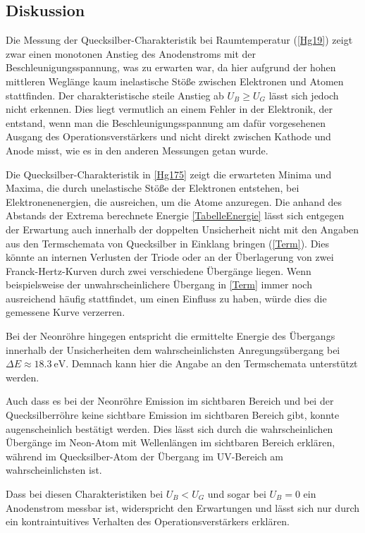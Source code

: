 \documentclass[
	a4paper,
	12pt,
	pagesize,
	ngerman
]{scrartcl}
\begin{document}
	\subsection{Diskussion}
	Die Messung der Quecksilber-Charakteristik bei Raumtemperatur (\cref{Hg19}) zeigt zwar einen monotonen Anstieg des Anodenstroms mit der Beschleunigungsspannung, was zu erwarten war, da hier aufgrund der hohen mittleren Weglänge kaum inelastische Stöße zwischen Elektronen und Atomen stattfinden. 
	Der charakteristische steile Anstieg ab $U_B \geq U_G$ lässt sich jedoch nicht erkennen.
	Dies liegt vermutlich an einem Fehler in der Elektronik, der entstand, wenn man die Beschleunigungsspannung am dafür vorgesehenen Ausgang des Operationsverstärkers und nicht direkt zwischen Kathode und Anode misst, wie es in den anderen Messungen getan wurde.
	\par
	Die Quecksilber-Charakteristik in \cref{Hg175} zeigt die erwarteten Minima und Maxima, die durch unelastische Stöße der Elektronen entstehen, bei Elektronenenergien, die ausreichen, um die Atome anzuregen.
	Die anhand des Abstands der Extrema berechnete Energie \cref{TabelleEnergie} lässt sich entgegen der Erwartung auch innerhalb der doppelten Unsicherheit nicht mit den Angaben aus den Termschemata von Quecksilber in Einklang bringen (\cref{Term}).
	Dies könnte an internen Verlusten der Triode oder an der Überlagerung von zwei Franck-Hertz-Kurven durch zwei verschiedene Übergänge liegen.
	Wenn beispielsweise der unwahrscheinlichere Übergang in \cref{Term} immer noch ausreichend häufig stattfindet, um einen Einfluss zu haben, würde dies die gemessene Kurve verzerren.
	\par
	Bei der Neonröhre hingegen entspricht die ermittelte Energie des Übergangs innerhalb der Unsicherheiten dem wahrscheinlichsten Anregungsübergang bei $ \Delta E \approx \SI{18,3}{\electronvolt}$.
	Demnach kann hier die Angabe an den Termschemata unterstützt werden.
	
	Auch dass es bei der Neonröhre Emission im sichtbaren Bereich und bei der Quecksilberröhre keine sichtbare Emission im sichtbaren Bereich gibt, konnte augenscheinlich bestätigt werden.
	Dies lässt sich durch die wahrscheinlichen Übergänge im Neon-Atom mit Wellenlängen im sichtbaren Bereich erklären, während im Quecksilber-Atom der Übergang im UV-Bereich am wahrscheinlichsten ist.
	
	Dass bei diesen Charakteristiken bei $U_B < U_G$ und sogar bei $U_B=0$ ein Anodenstrom messbar ist, widerspricht den Erwartungen und lässt sich nur durch ein kontraintuitives Verhalten des Operationsverstärkers erklären.
	
\end{document}
